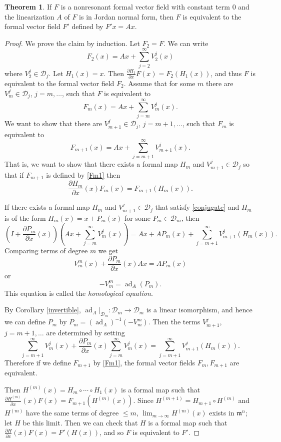 \documentclass{article}
\theoremstyle{definition}
\newtheorem{theorem}{Theorem}
\newcommand{\ad}{\operatorname{ad}}
\begin{document}
\begin{theorem}
If $F$ is a nonresonant formal vector field with constant term $0$  and the linearization $A$ of $F$ is in Jordan normal form, then $F$ is equivalent to the formal vector field $F'$ defined by $F'x=Ax$.
\end{theorem}
\begin{proof}
We prove the claim by induction.
Let $F_2=F$. We can write
\[
F_2(x)=Ax+\sum_{j=2}^\infty V_2^j(x)
\]
where $V_2^j \in \mathscr{D}_j$. Let $H_1(x)=x$. Then $\frac{\partial H_1}{\partial x} F(x)=F_2(H_1(x))$, and thus $F$ is equivalent to the formal vector field $F_2$. Assume that for some 
$m$ there are $V_m^j \in \mathscr{D}_j$, $j=m,\ldots$, such that $F$ is equivalent to
\[
F_m(x)=Ax+\sum_{j=m}^\infty V_m^j(x).
\]
We want to show that there are $V_{m+1}^j \in \mathscr{D}_j$, $j=m+1,\ldots$, such that $F_m$ is equivalent to
\begin{equation}
\label{Fm1}
F_{m+1}(x)=Ax+\sum_{j=m+1}^\infty V_{m+1}^j(x).
\end{equation}
That is, we want to show that there exists a formal map $H_m$ and
$V_{m+1}^j \in \mathscr{D}_j$ so that if $F_{m+1}$ is defined by \eqref{Fm1} then 
\begin{equation}
\label{conjugate}
\frac{\partial H_m}{\partial x}(x) F_m(x)=F_{m+1}(H_m(x)).
\end{equation}

If there exists a formal map $H_m$ and $V_{m+1}^j \in \mathscr{D}_j$ that satisfy \eqref{conjugate} and
$H_m$ is of the form
$H_m(x)=x+P_m(x)$ for some $P_m \in \mathscr{D}_m$, 
then
\begin{equation}
\label{determing}
(I+\frac{\partial P_m}{\partial x}(x))(Ax+\sum_{j=m}^\infty V^j_m(x))
=Ax+AP_m(x)+\sum_{j=m+1}^\infty V_{m+1}^j(H_m(x)).
\end{equation}
Comparing terms of degree $m$ we get
\[
V^m_m(x)+\frac{\partial P_m}{\partial x}(x)Ax=AP_m(x)
\]
or
\[
-V^m_m=\ad_A(P_m).
\]
This equation is called the {\em homological equation}. 

By Corollary \ref{invertible}, $\ad_A|_{\mathscr{D}_m}:\mathscr{D}_m \to \mathscr{D}_m$ is a linear isomorphism, and hence we can define $P_m$ by
$P_m=(\ad_A)^{-1}(-V^m_m)$. 
Then the terms $V^j_{m+1}$, $j=m+1,\ldots$ are determined by setting
\[
\sum_{j=m+1}^\infty V^j_m(x)
+
\frac{\partial P_m}{\partial x}(x)
\sum_{j=m}^\infty V^j_m(x)
=\sum_{j=m+1}^\infty V_{m+1}^j(H_m(x)).
\]
Therefore if we define $F_{m+1}$ by \eqref{Fm1}, the formal vector fields
$F_m,F_{m+1}$ are equivalent.

Then 
$H^{(m)}(x)=H_m \circ \cdots \circ H_1(x)$ is a formal map such that
$\frac{\partial H^{(m)}}{\partial x}(x) F(x)=F_{m+1}(H^{(m)}(x))$.
Since $H^{(m+1)}=H_{m+1} \circ H^{(m)}$ and $H^{(m)}$ have the same terms of
degree $\leq m$,  $\lim_{m \to \infty} H^{(m)}(x)$ exists in $\mathfrak{m}^n$; let $H$ be this limit. Then
we can check that $H$ is a formal map such that 
$\frac{\partial H}{\partial x}(x) F(x)=F'(H(x))$, and so
$F$ is equivalent to $F'$.
\end{proof}
\end{document}
